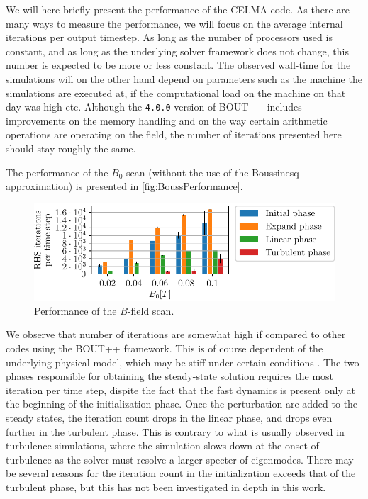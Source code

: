 %
We will here briefly present the performance of the CELMA-code.
As there are many ways to measure the performance, we will focus on the average internal iterations per output timestep.
As long as the number of processors used is constant, and as long as the underlying solver framework does not change, this number is expected to be more or less constant.
The observed wall-time for the simulations will on the other hand depend on parameters such as the machine the simulations are executed at, if the computational load on the machine on that day was high etc.
Although the \texttt{4.0.0}-version of BOUT++ includes improvements on the memory handling and on the way certain arithmetic operations are operating on the field, the number of iterations presented here should stay roughly the same.

The performance of the $B_0$-scan (without the use of the Boussinesq approximation) is presented in \cref{fig:BoussPerformance}.
%
\begin{figure}[htb]
    \centering
    \includegraphics{fig/results/performance/RHSEvalsPerTimeBScan}
    \caption{Performance of the $B$-field scan.}
    \label{fig:BPerformance}
\end{figure}
%
We observe that number of iterations are somewhat high if compared to other codes using the BOUT++ framework.
This is of course dependent of the underlying physical model, which may be stiff under certain conditions \cite{Leveque2007book}.
The two phases responsible for obtaining the steady-state solution requires the most iteration per time step, dispite the fact that the fast dynamics is present only at the beginning of the initialization phase.
Once the perturbation are added to the steady states, the iteration count drops in the linear phase, and drops even further in the turbulent phase.
This is contrary to what is usually observed in turbulence simulations, where the simulation slows down at the onset of turbulence as the solver must resolve a larger specter of eigenmodes.
There may be several reasons for the iteration count in the initialization exceeds that of the turbulent phase, but this has not been investigated in depth in this work.

